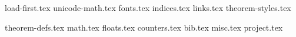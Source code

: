 
{load-first.tex}
{unicode-math.tex}
{fonts.tex}
{indices.tex}
{links.tex}
{theorem-styles.tex}
\theoremstyle{rmnl}
{theorem-defs.tex}
{math.tex}
{floats.tex}
{counters.tex}
{bib.tex}
{misc.tex}
{project.tex}
